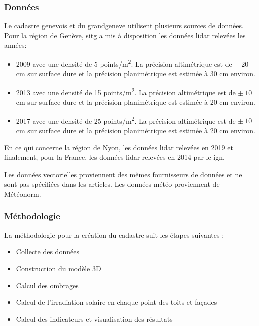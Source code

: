 \subsubsection{Données}
\par{Le cadastre genevois et du \gls{grandgeneve} \cite{desthieux_cadastre_nodate} utilisent plusieurs sources de données. Pour la région de Genève, \acrshort{sitg} a mis à disposition les données \gls{lidar} relevées les années:}
\begin{itemize}
    \item 2009 \cite{sitg_nuages_2009} avec une densité de 5 \si{\unit{points/m^2}}. La précision altimétrique est de $\pm\ 20$ \si{\unit{cm}} sur surface dure et la précision planimétrique est estimée à 30 \si{\unit{cm}} environ.
    \item 2013 \cite{sitg_nuages_2013} avec une densité de 15 \si{\unit{points/m^2}}. La précision altimétrique est de $\pm\ 10$ \si{\unit{cm}} sur surface dure et la précision planimétrique est estimée à 20 \si{\unit{cm}} environ.
    \item 2017 \cite{sitg_nuages_2017} avec une densité de 25 \si{\unit{points/m^2}}. La précision altimétrique est de $\pm\ 10$ \si{\unit{cm}} sur surface dure et la précision planimétrique est estimée à 20 \si{\unit{cm}} environ.
\end{itemize}
\par{En ce qui concerne la région de Nyon, les données \gls{lidar} relevées en 2019 \cite{etat_de_vaud_lidar_nodate} et finalement, pour la France, les données \gls{lidar} relevées en 2014 \cite{ign_ign_nodate} par le \acrshort{ign}.}
\par{Les données vectorielles proviennent des mêmes fournisseurs de données et ne sont pas spécifiées dans les articles. Les données météo proviennent de Météonorm.}


\subsubsection{Méthodologie}

\par{La méthodologie \cite{desthieux_solar_2018} pour la création du cadastre suit les étapes suivantes :}
\begin{itemize}
    \item Collecte des données
    \item Construction du modèle 3D
    \item Calcul des ombrages
    \item Calcul de l'irradiation solaire en chaque point des toits et façades
    \item Calcul des indicateurs et visualisation des résultats
\end{itemize}

